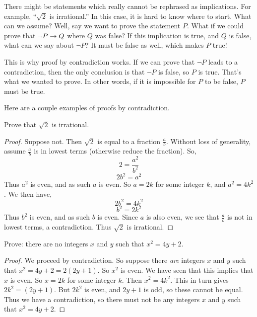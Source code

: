 \documentclass[12pt]{article}
\begin{document}
There might be statements which really cannot be rephrased as implications.  For example, ``$\sqrt 2$ is irrational.''  In this case, it is hard to know where to start. What can we assume? Well, say we want to prove the statement $P$.  What if we could prove that $\neg P \rightarrow Q$ where $Q$ was false?  If this implication is true, and $Q$ is false, what can we say about $\neg P$?  It must be false as well, which makes $P$ true!

 This is why proof by contradiction works.  If we can prove that $\neg P$ leads to a contradiction, then the only conclusion is that $\neg P$ is false, so $P$ is true.  That's what we wanted to prove.  In other words, if it is impossible for $P$ to be false, $P$ must be true.

 Here are a couple examples of proofs by contradiction.

   \begin{example}Prove that $\sqrt{2}$ is irrational.

   \begin{proof}
 	Suppose not.  Then $\sqrt 2$ is equal to a fraction $\frac{a}{b}$.  Without loss of generality, assume $\frac{a}{b}$ is in lowest terms (otherwise reduce the fraction).  So,
 	\[2 = \frac{a^2}{b^2}\]
 	\[2b^2 = a^2\]
 	Thus $a^2$ is even, and as such $a$ is even.  So $a = 2k$ for some integer $k$, and $a^2 = 4k^2$.  We then have,
 	\[2b^2 = 4k^2\]
 	\[b^2 = 2k^2\]
 	Thus $b^2$ is even, and as such $b$ is even.  Since $a$ is also even, we see that $\frac{a}{b}$ is not in lowest terms, a contradiction.  Thus $\sqrt 2$ is irrational.
 \end{proof}
  \end{example}

\begin{example} Prove: there are no integers $x$ and $y$ such that $x^2  = 4y + 2$.
 \begin{proof}
 	We proceed by contradiction.  So suppose there {\em are} integers $x$ and $y$ such that $x^2 = 4y + 2 = 2(2y + 1)$.  So $x^2$ is even.  We have seen that this implies that $x$ is even.  So $x = 2k$ for some integer $k$.  Then $x^2 = 4k^2$.  This in turn gives
 	$2k^2 = (2y + 1)$.  But $2k^2$ is even, and $2y + 1$ is odd, so these cannot be equal.  Thus we have a contradiction, so there must not be any integers $x$ and $y$ such that $x^2 = 4y + 2$.
 \end{proof}
 \end{example}
\end{document}
